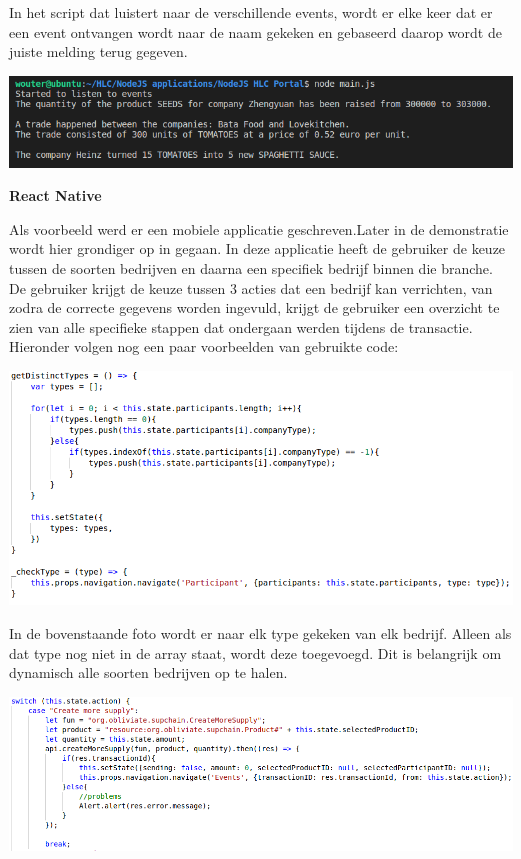 \documentclass[fleqn,a4paper,12pt]{book}
\begin{document}
In het script dat luistert naar de verschillende events, wordt er elke keer dat er een event ontvangen wordt naar de naam gekeken en gebaseerd daarop wordt de juiste melding terug gegeven.

\begin{center}
	\includegraphics[width=14cm]{img/listen-results}\\[1cm]
\end{center}

\textbf{React Native}

Als voorbeeld werd er een mobiele applicatie geschreven.Later in de demonstratie wordt hier grondiger op in gegaan. In deze applicatie heeft de gebruiker de keuze tussen de soorten bedrijven en daarna een specifiek bedrijf binnen die branche. De gebruiker krijgt de keuze tussen 3 acties dat een bedrijf kan verrichten, van zodra de correcte gegevens worden ingevuld, krijgt de gebruiker een overzicht te zien van alle specifieke stappen dat ondergaan werden tijdens de transactie. Hieronder volgen nog een paar voorbeelden van gebruikte code:

\begin{center}
	\includegraphics[width=14cm]{img/react-types}\\[1cm]
\end{center}

In de bovenstaande foto wordt er naar elk type gekeken van elk bedrijf. Alleen als dat type nog niet in de array staat, wordt deze toegevoegd. Dit is belangrijk om dynamisch alle soorten bedrijven op te halen.

\begin{center}
	\includegraphics[width=14cm]{img/react-action}\\[1cm]
\end{center}
\end{document}
